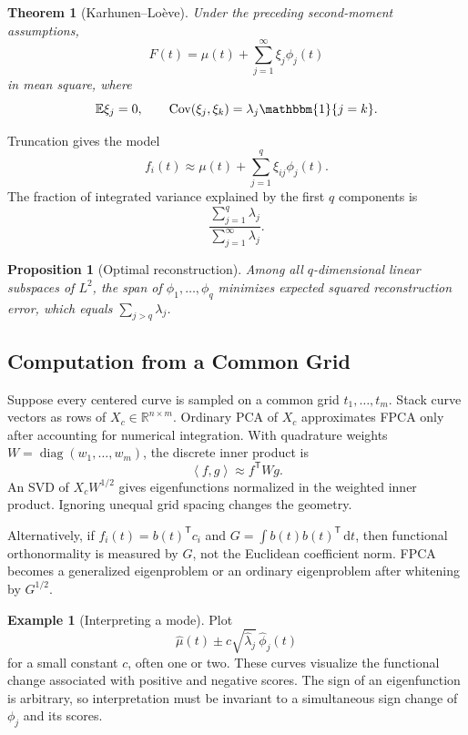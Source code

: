 \documentclass[12pt,oneside]{book}
\numberwithin{equation}{section}
\theoremstyle{definition}
\newtheorem{example}{Example}[section]
\theoremstyle{plain}
\newtheorem{theorem}{Theorem}[section]
\newtheorem{proposition}{Proposition}[section]
\theoremstyle{remark}
\newcommand{\R}{\mathbb{R}}
\newcommand{\E}{\mathbb{E}}
\newcommand{\Cov}{\mathrm{Cov}}
\newcommand{\ind}{\mathbbm{1}}
\newcommand{\inner}[2]{\left\langle #1, #2 \right\rangle}
\newcommand{\dd}{\,\mathrm{d}}
\newcommand{\diag}{\operatorname{diag}}
\begin{document}
\begin{theorem}[Karhunen--Loève]
Under the preceding second-moment assumptions,
\[
    F(t)=\mu(t)+\sum_{j=1}^\infty\xi_j\phi_j(t)
\]
in mean square, where
\[
    \E\xi_j=0,\qquad
    \Cov(\xi_j,\xi_k)=\lambda_j\ind\{j=k\}.
\]
\end{theorem}

Truncation gives the model
\begin{equation}
    f_i(t)\approx\mu(t)+\sum_{j=1}^q\xi_{ij}\phi_j(t).
    \label{eq:truncated-fpca}
\end{equation}
The fraction of integrated variance explained by the first $q$ components is
\[
    \frac{\sum_{j=1}^q\lambda_j}
         {\sum_{j=1}^\infty\lambda_j}.
\]

\begin{proposition}[Optimal reconstruction]
Among all $q$-dimensional linear subspaces of $L^2$, the span of
$\phi_1,\ldots,\phi_q$ minimizes expected squared reconstruction error, which
equals $\sum_{j>q}\lambda_j$.
\end{proposition}

\subsection{Computation from a Common Grid}

Suppose every centered curve is sampled on a common grid
$t_1,\ldots,t_m$. Stack curve vectors as rows of
$X_c\in\R^{n\times m}$. Ordinary PCA of $X_c$ approximates FPCA only after
accounting for numerical integration. With quadrature weights
$W=\diag(w_1,\ldots,w_m)$, the discrete inner product is
\[
    \inner f g\approx f^\mathsf TWg.
\]
An SVD of $X_cW^{1/2}$ gives eigenfunctions normalized in the weighted inner
product. Ignoring unequal grid spacing changes the geometry.

Alternatively, if $f_i(t)=b(t)^\mathsf Tc_i$ and
$G=\int b(t)b(t)^\mathsf T\dd t$, then functional orthonormality is measured
by $G$, not the Euclidean coefficient norm. FPCA becomes a generalized
eigenproblem or an ordinary eigenproblem after whitening by $G^{1/2}$.

\begin{example}[Interpreting a mode]
Plot
\[
    \widehat\mu(t)\pm c\sqrt{\widehat\lambda_j}\,
    \widehat\phi_j(t)
\]
for a small constant $c$, often one or two. These curves visualize the
functional change associated with positive and negative scores. The sign of
an eigenfunction is arbitrary, so interpretation must be invariant to a
simultaneous sign change of $\phi_j$ and its scores.
\end{example}
\end{document}
